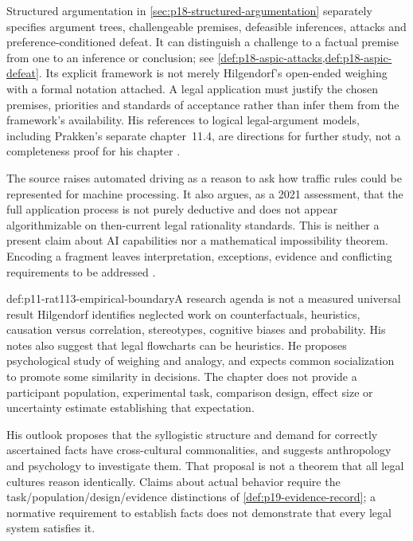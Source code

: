 Structured argumentation in \cref{sec:p18-structured-argumentation}
separately specifies argument trees, challengeable premises, defeasible
inferences, attacks and preference-conditioned defeat. It can distinguish
a challenge to a factual premise from one to an inference or conclusion;
see \cref{def:p18-aspic-attacks,def:p18-aspic-defeat}. Its explicit
framework is not merely Hilgendorf's open-ended weighing with a formal
notation attached. A legal application must justify the chosen premises,
priorities and standards of acceptance rather than infer them from the
framework's availability. His references to logical legal-argument models,
including Prakken's separate chapter~11.4, are directions for further study,
not a completeness proof for his chapter
\parencite[notes~14, 17 on p.~665]{Hilgendorf2021LegalLogic}.

The source raises automated driving as a reason to ask how traffic rules
could be represented for machine processing. It also argues, as a 2021
assessment, that the full application process is not purely deductive and
does not appear algorithmizable on then-current legal rationality standards.
This is neither a present claim about AI capabilities nor a mathematical
impossibility theorem. Encoding a fragment leaves interpretation, exceptions,
evidence and conflicting requirements to be addressed
\parencite[pp.~659--660, 662, note~4 on p.~665]{Hilgendorf2021LegalLogic}.

\begin{proofboundary}{def:p11-rat113-empirical-boundary}{A research agenda is not a measured universal result}
Hilgendorf identifies neglected work on counterfactuals, heuristics,
causation versus correlation, stereotypes, cognitive biases and probability.
His notes also suggest that legal flowcharts can be heuristics. He proposes
psychological study of weighing and analogy, and expects common socialization
to promote some similarity in decisions. The chapter does not provide a
participant population, experimental task, comparison design, effect size
or uncertainty estimate establishing that expectation.

His outlook proposes that the syllogistic structure and demand for correctly
ascertained facts have cross-cultural commonalities, and suggests anthropology
and psychology to investigate them. That proposal is not a theorem that all
legal cultures reason identically. Claims about actual behavior require the
task/population/design/evidence distinctions of
\cref{def:p19-evidence-record}; a normative requirement to establish facts
does not demonstrate that every legal system satisfies it.
\end{proofboundary}

